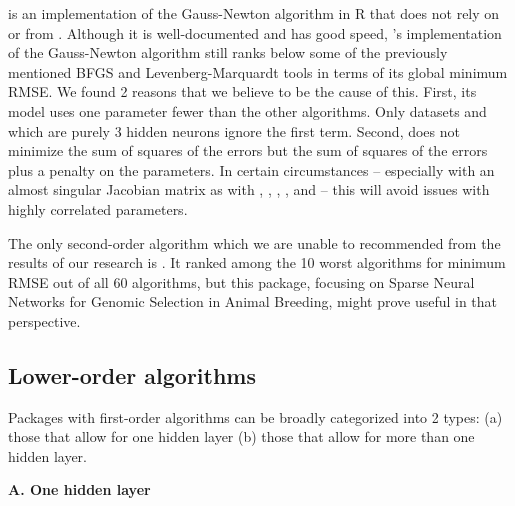  \citep{R-brnn} is an implementation of the Gauss-Newton
algorithm in \textsf{R} that does not rely on  or 
from . Although it is well-documented and has good speed,
's implementation of the Gauss-Newton algorithm still
ranks below some of the previously mentioned BFGS and
Levenberg-Marquardt tools in terms of its global minimum RMSE. We found
2 reasons that we believe to be the cause of this. First, its model uses
one parameter fewer than the other algorithms. Only datasets
 and  which are purely 3 hidden neurons
ignore the first term. Second,  does not minimize the sum
of squares of the errors but the sum of squares of the errors plus a
penalty on the parameters. In certain circumstances -- especially with
an almost singular Jacobian matrix as with ,
, , , and 
-- this will avoid issues with highly correlated parameters.

The only second-order algorithm which we are unable to recommended from
the results of our research is  \citep{R-snnR}. It ranked
among the 10 worst algorithms for minimum RMSE out of all 60 algorithms,
but this package, focusing on Sparse Neural Networks for Genomic
Selection in Animal Breeding, might prove useful in that perspective.

\hypertarget{lower-order-algorithms}{%
\subsection{Lower-order algorithms}\label{lower-order-algorithms}}

Packages with first-order algorithms can be broadly categorized into 2
types: (a) those that allow for one hidden layer (b) those that allow
for more than one hidden layer.

\textbf{A. One hidden layer}

